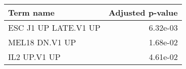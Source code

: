 \begin{tabular}{lr}
\toprule
           Term name &  Adjusted p-value \\
\midrule
ESC J1 UP LATE.V1 UP &          6.32e-03 \\
      MEL18 DN.V1 UP &          1.68e-02 \\
        IL2 UP.V1 UP &          4.61e-02 \\
\bottomrule
\end{tabular}
